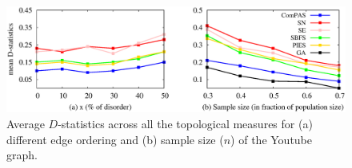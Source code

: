 \begin{figure}[!h]
\centering
\includegraphics[width=0.8\columnwidth]{./texfiles/Chapter_2/figures/param_estimate_1.eps}
\caption{\label{param_est_1}Average $D$-statistics across all the topological measures for (a) different edge ordering and (b) sample size ($n$) of the Youtube graph.}
\vspace{4mm}
\end{figure}
\fi








